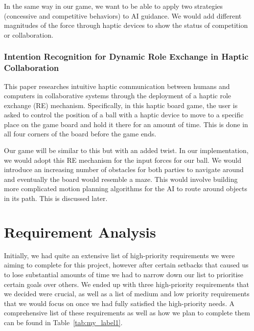 \documentclass[a4paper]{article}
\begin{document}
In the same way in our game, we want to be able to apply two strategies (concessive and competitive behaviors) to AI guidance. We would add different magnitudes of the force through haptic devices to show the status of competition or collaboration. 

\subsubsection*{Intention Recognition for Dynamic Role Exchange in Haptic Collaboration \cite{kucukyilmaz2012intention}}

This paper researches intuitive haptic communication between humans and computers in collaborative systems through the deployment of a haptic role exchange (RE) mechanism. Specifically,  in this haptic board game, the user is asked to control the position of a ball with a haptic device to move to a specific place on the game board and hold it there for an amount of time. This is done in all four corners of the board before the game ends. 

Our game will be similar to this but with an added twist. In our implementation, we would adopt this RE mechanism for the input forces for our ball. We would introduce an increasing number of obstacles for both parties to navigate around and eventually the board would resemble a maze. This would involve building more complicated motion planning algorithms for the AI to route around objects in its path. This is discussed later.

\section{Requirement Analysis}
Initially, we had quite an extensive list of high-priority requirements we were aiming to complete for this project, however after certain setbacks that caused us to lose substantial amounts of time we had to narrow down our list to prioritise certain goals over others. We ended up with three high-priority requirements that we decided were crucial, as well as a list of medium and low priority requirements that we would focus on once we had fully satisfied the high-priority needs. A comprehensive list of these requirements as well as how we plan to complete them can be found in Table~\ref{tab:my_label1}.
\end{document}
